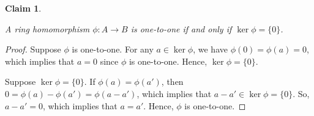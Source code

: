 \documentclass[a4paper,12pt]{report}
\newcounter{statement}
\numberwithin{statement}{chapter}
\newtheorem{claim}[statement]{Claim}
\numberwithin{equation}{chapter}
\numberwithin{section}{chapter}
\numberwithin{subsection}{section}
\begin{document}
\begin{claim}
\label{claim:onetooneker}


A ring homomorphism $\phi : A \rightarrow B$ is one-to-one if and only if $\ker \phi = \{0\}$.
\end{claim}
\begin{proof}

Suppose $\phi$ is one-to-one.  For any $a \in \ker \phi$, we have $\phi(0) = \phi(a) = 0$,
which implies that $a = 0$ since $\phi$ is one-to-one.  Hence, $\ker \phi = \{0\}$.



Suppose $\ker \phi = \{0\}$.  If $\phi(a) = \phi(a')$,
then $0 = \phi(a) - \phi(a') = \phi(a - a')$, which implies that $a - a' \in \ker \phi = \{0\}$.
So, $a - a' = 0$, which implies that $a = a'$.  Hence, $\phi$ is one-to-one.


\end{proof}
\end{document}
